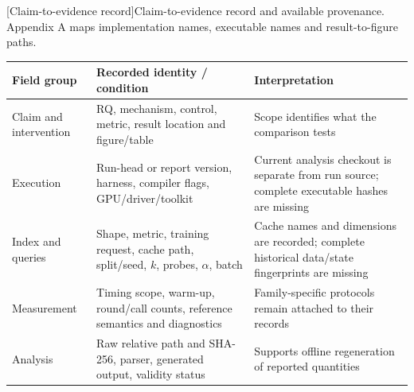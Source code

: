 \par\medskip\noindent\begin{minipage}{\linewidth}
\centering\captionsetup{hypcap=false}
[Claim-to-evidence record]{Claim-to-evidence record and available provenance. Appendix A
maps implementation names, executable names and result-to-figure paths.}
\label{tab:3-ledger}
\footnotesize\setlength{\tabcolsep}{4pt}
\begin{tabularx}{\linewidth}{@{}>{\raggedright\arraybackslash}p{.24\linewidth}*{2}{>{\raggedright\arraybackslash}X}@{}}
\toprule
Field group & Recorded identity / condition & Interpretation \\
\midrule
Claim and intervention & RQ, mechanism, control, metric, result location
and figure/table & Scope identifies what the comparison tests \\
Execution & Run-head or report version, harness, compiler flags,
GPU/driver/toolkit & Current analysis checkout is separate from run source;
complete executable hashes are missing \\
Index and queries & Shape, metric, training request, cache path,
split/seed, $k$, probes, $\alpha$, batch & Cache names and dimensions
are recorded; complete historical data/state fingerprints are missing \\
Measurement & Timing scope, warm-up, round/call counts,
reference semantics and diagnostics & Family-specific protocols remain
attached to their records \\
Analysis & Raw relative path and SHA-256, parser, generated output,
validity status & Supports offline regeneration of reported quantities \\
\bottomrule
\end{tabularx}
\end{minipage}\par\medskip
